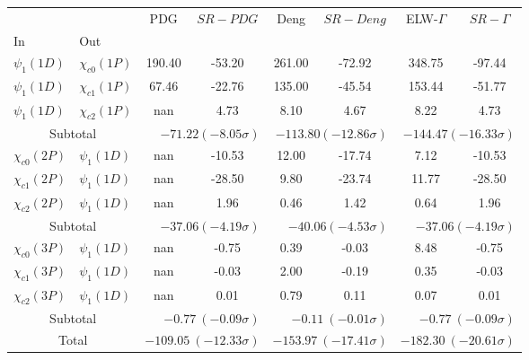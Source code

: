 \begin{tabular}{|l|l|c|c|c|c|c|c|}%
\hline%
&&PDG&$SR-PDG$&Deng&$SR-Deng$&ELW-$\Gamma$&$SR-\Gamma$\\%
In&Out&&&&&&\\%
\hline%
$\psi_{1}(1D)$&$\chi_{c0}(1P)$&190.40&-53.20&261.00&-72.92&348.75&-97.44\\%
$\psi_{1}(1D)$&$\chi_{c1}(1P)$&67.46&-22.76&135.00&-45.54&153.44&-51.77\\%
$\psi_{1}(1D)$&$\chi_{c2}(1P)$&nan&4.73&8.10&4.67&8.22&4.73\\%
\hline%
\hline%
\multicolumn{2}{|c|}{Subtotal}&\multicolumn{2}{|r|}{$-71.22 (-8.05\sigma)$}&\multicolumn{2}{|r|}{$-113.80 (-12.86\sigma)$}&\multicolumn{2}{|r|}{$-144.47 (-16.33\sigma)$}\\%
\hline%
\hline%
$\chi_{c0}(2P)$&$\psi_{1}(1D)$&nan&-10.53&12.00&-17.74&7.12&-10.53\\%
$\chi_{c1}(2P)$&$\psi_{1}(1D)$&nan&-28.50&9.80&-23.74&11.77&-28.50\\%
$\chi_{c2}(2P)$&$\psi_{1}(1D)$&nan&1.96&0.46&1.42&0.64&1.96\\%
\hline%
\hline%
\multicolumn{2}{|c|}{Subtotal}&\multicolumn{2}{|r|}{$-37.06 (-4.19\sigma)$}&\multicolumn{2}{|r|}{$-40.06 (-4.53\sigma)$}&\multicolumn{2}{|r|}{$-37.06 (-4.19\sigma)$}\\%
\hline%
\hline%
$\chi_{c0}(3P)$&$\psi_{1}(1D)$&nan&-0.75&0.39&-0.03&8.48&-0.75\\%
$\chi_{c1}(3P)$&$\psi_{1}(1D)$&nan&-0.03&2.00&-0.19&0.35&-0.03\\%
$\chi_{c2}(3P)$&$\psi_{1}(1D)$&nan&0.01&0.79&0.11&0.07&0.01\\%
\hline%
\hline%
\multicolumn{2}{|c|}{Subtotal}&\multicolumn{2}{|r|}{$-0.77~(-0.09\sigma)$}&\multicolumn{2}{|r|}{$-0.11~(-0.01\sigma)$}&\multicolumn{2}{|r|}{$-0.77~(-0.09\sigma)$}\\%
\hline%
\hline%
\multicolumn{2}{|c|}{Total}&\multicolumn{2}{|r|}{$-109.05~(-12.33\sigma)$}&\multicolumn{2}{|r|}{$-153.97~(-17.41\sigma)$}&\multicolumn{2}{|r|}{$-182.30~(-20.61\sigma)$}\\%
\hline%
\end{tabular}